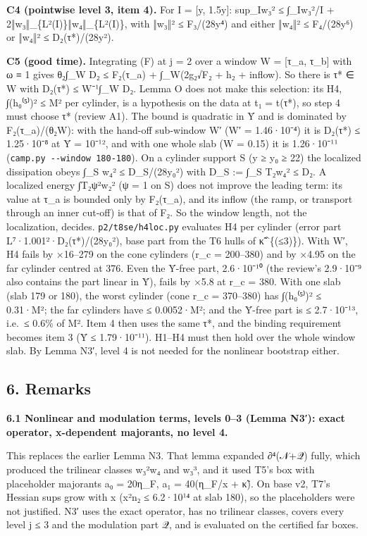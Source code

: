 \documentclass[
]{article}
\begin{document}
\textbf{C4 (pointwise level 3, item 4).} For I = {[}y, 1.5y{]}:
sup\_I\textbar w₃\textbar² ≤ ∫\_Iw₃²/\textbar I\textbar{} +
2‖w₃‖\_\{L²(I)\}‖w₄‖\_\{L²(I)\}, with ‖w₃‖² ≤ F₃/(28y⁴) and either ‖w₄‖²
≤ F₄/(28y⁶) or ‖w₄‖² ≤ D₂(τ*)/(28y²).

\textbf{C5 (good time).} Integrating (F) at j = 2 over a window W =
{[}τ\_a, τ\_b{]} with ω ≡ 1 gives θ₂∫\_W D₂ ≤ F₂(τ\_a) + ∫\_W(2g₂√F₂ +
h₂ + inflow). So there is τ* ∈ W with D₂(τ*) ≤ \textbar W\textbar⁻¹∫\_W
D₂. Lemma O does not make this selection: its H4, ∫(h₀⁽⁵⁾)² ≤ M² per
cylinder, is a hypothesis on the data at t₁ = t(τ*), so step 4 must
choose τ* (review A1). The bound is quadratic in Ȳ and is dominated by
F₂(τ\_a)/(θ₂\textbar W\textbar): with the hand-off sub-window W′
(\textbar W′\textbar{} = 1.46·10⁻⁴) it is D₂(τ*) ≤ 1.25·10⁻⁸ at Ȳ =
10⁻¹², and with one whole slab (\textbar W\textbar{} = 0.15) it is
1.26·10⁻¹¹ (\texttt{camp.py\ -\/-window\ 180-180}). On a cylinder
support S (y ≥ y₀ ≥ 22) the localized dissipation obeys ∫\_S w₄² ≤
D\_S/(28y₀²) with D\_S := ∫\_S T₂w₄² ≤ D₂. A localized energy ∫T₂ψ²w₂²
(ψ = 1 on S) does not improve the leading term: its value at τ\_a is
bounded only by F₂(τ\_a), and its inflow (the ramp, or transport through
an inner cut-off) is that of F₂. So the window length, not the
localization, decides. \texttt{p2/t8se/h4loc.py} evaluates H4 per
cylinder (error part L⁷·1.001²·D₂(τ*)/(28y₀²), base part from the T6
hulls of κ̃\^{}\{(≤3)\}). With W′, H4 fails by ×16--279 on the cone
cylinders (r\_c = 200--380) and by ×4.95 on the far cylinder centred at
376. Even the Ȳ-free part, 2.6·10⁻¹⁰ (the review's 2.9·10⁻⁹ also
contains the part linear in Ȳ), fails by ×5.8 at r\_c = 380. With one
slab (slab 179 or 180), the worst cylinder (cone r\_c = 370--380) has
∫(h₀⁽⁵⁾)² ≤ 0.31·M²; the far cylinders have ≤ 0.0052·M²; and the Ȳ-free
part is ≤ 2.7·10⁻¹³, i.e.~≤ 0.6\% of M². Item 4 then uses the same τ*,
and the binding requirement becomes item 3 (Ȳ ≤ 1.79·10⁻¹¹). H1--H4 must
then hold over the whole window slab. By Lemma N3′, level 4 is not
needed for the nonlinear bootstrap either.

\hypertarget{remarks}{%
\subsection{6. Remarks}\label{remarks}}

\textbf{6.1 Nonlinear and modulation terms, levels 0--3 (Lemma N3′):
exact operator, x-dependent majorants, no level 4.}

This replaces the earlier Lemma N3. That lemma expanded ∂⁴(𝒩+𝒬) fully,
which produced the trilinear classes w₃²w₄ and w₃³, and it used T5's box
with placeholder majorants a₀ = 20η\_F, a₁ = 40(η\_F/x +
\textbar κ̃\textbar). On base v2, T7's Hessian sups grow with x (x²n₂ ≤
6.2·10¹⁴ at slab 180), so the placeholders were not justified. N3′ uses
the exact operator, has no trilinear classes, covers every level j ≤ 3
and the modulation part 𝒬, and is evaluated on the certified far boxes.
\end{document}
